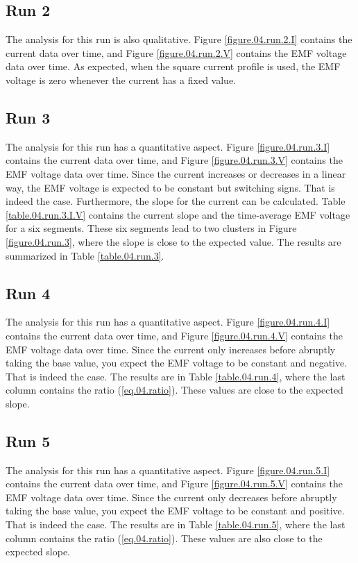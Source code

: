 \subsection{Run 2}
The analysis for this run is also qualitative. Figure \ref{figure.04.run.2.I} contains the current data over time, and Figure \ref{figure.04.run.2.V} contains the EMF voltage data over time. As expected, when the square current profile is used, the EMF voltage is zero whenever the current has a fixed value.
\subsection{Run 3}
The analysis for this run has a quantitative aspect. Figure \ref{figure.04.run.3.I} contains the current data over time, and Figure \ref{figure.04.run.3.V} contains the EMF voltage data over time. Since the current increases or decreases in a linear way, the EMF voltage is expected to be constant but switching signs. That is indeed the case. Furthermore, the slope for the current can be calculated. Table \ref{table.04.run.3.I.V} contains the current slope and the time-average EMF voltage for a six segments. These six segments lead to two clusters in Figure \ref{figure.04.run.3}, where the slope is close to the expected value. The results are summarized in Table \ref{table.04.run.3}.
\subsection{Run 4}
The analysis for this run has a quantitative aspect. Figure \ref{figure.04.run.4.I} contains the current data over time, and Figure \ref{figure.04.run.4.V} contains the EMF voltage data over time. Since the current only increases before abruptly taking the base value, you expect the EMF voltage to be constant and negative. That is indeed the case. The results are in Table \ref{table.04.run.4}, where the last column contains the ratio (\ref{eq.04.ratio}). These values are close to the expected slope.
\subsection{Run 5}
The analysis for this run has a quantitative aspect. Figure \ref{figure.04.run.5.I} contains the current data over time, and Figure \ref{figure.04.run.5.V} contains the EMF voltage data over time. Since the current only decreases before abruptly taking the base value, you expect the EMF voltage to be constant and positive. That is indeed the case. The results are in Table \ref{table.04.run.5}, where the last column contains the ratio (\ref{eq.04.ratio}). These values are also close to the expected slope.
